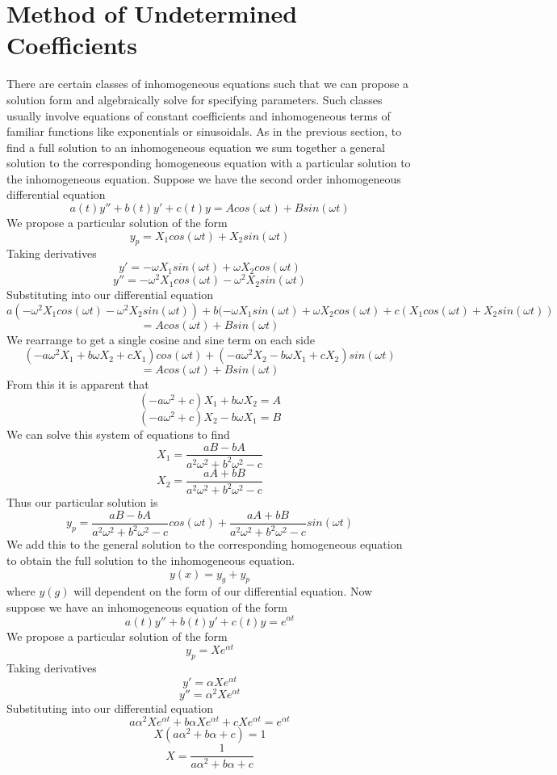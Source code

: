\section{Method of Undetermined Coefficients}
\noindent There are certain classes of inhomogeneous equations such that we can propose a solution form and algebraically solve for specifying parameters. Such classes usually involve equations of constant coefficients and inhomogeneous terms of familiar functions like exponentials or sinusoidals. As in the previous section, to find a full solution to an inhomogeneous equation we sum together a general solution to the corresponding homogeneous equation with a particular solution to the inhomogeneous equation. Suppose we have the second order inhomogeneous differential equation
\[a(t)y'' + b(t)y'+c(t)y = Acos(\omega t) + Bsin(\omega t)\]
We propose a particular solution of the form
\[y_p = X_1cos(\omega t) + X_2sin(\omega t)\]
Taking derivatives
\[y' = -\omega X_1sin(\omega t) + \omega X_2cos(\omega t)\]
\[y'' = -\omega^2X_1cos(\omega t) - \omega^2X_2sin(\omega t)\]
Substituting into our differential equation
\[a(-\omega^2X_1cos(\omega t) - \omega^2X_2sin(\omega t)) + b( -\omega X_1sin(\omega t) + \omega X_2cos(\omega t) + c( X_1cos(\omega t) + X_2sin(\omega t)) \]
\[= Acos(\omega t) + Bsin(\omega t)\]
We rearrange to get a single cosine and sine term on each side
\[(-a\omega^2X_1+b\omega X_2+cX_1)cos(\omega t) + (-a\omega^2X_2 - b\omega X_1 + cX_2)sin(\omega t)\]
\[= Acos(\omega t) + Bsin(\omega t)\]
From this it is apparent that 
\[(-a\omega^2+c)X_1 + b\omega X_2 = A\]
\[(-a\omega^2+c)X_2 - b\omega X_1 = B\]
We can solve this system of equations to find
\[X_1 = \frac{aB-bA}{a^2\omega^2 + b^2\omega^2 - c}\]
\[X_2 = \frac{aA+bB}{a^2\omega^2 + b^2\omega^2 - c}\]
Thus our particular solution is
\[y_p = \frac{aB-bA}{a^2\omega^2 + b^2\omega^2 - c}cos(\omega t) + \frac{aA+bB}{a^2\omega^2 + b^2\omega^2 - c}sin(\omega t)\]
We add this to the general solution to the corresponding homogeneous equation to obtain the full solution to the inhomogeneous equation.
\[y(x) = y_g + y_p\]
where $y(g)$ will dependent on the form of our differential equation. 
Now suppose we have an inhomogeneous equation of the form
\[a(t)y'' + b(t)y' + c(t)y = e^{\alpha t}\]
We propose a particular solution of the form
\[y_p = Xe^{\alpha t}\]
Taking derivatives
\[y' = \alpha Xe^{\alpha t}\]
\[y'' = \alpha^2Xe^{\alpha t}\]
Substituting into our differential equation
\[a\alpha^2Xe^{\alpha t} + b\alpha Xe^{\alpha t} + cXe^{\alpha t} = e^{\alpha t}\]
\[X(a\alpha^2 + b\alpha + c) = 1\]
\[X = \frac{1}{a\alpha^2 + b\alpha + c}\]
